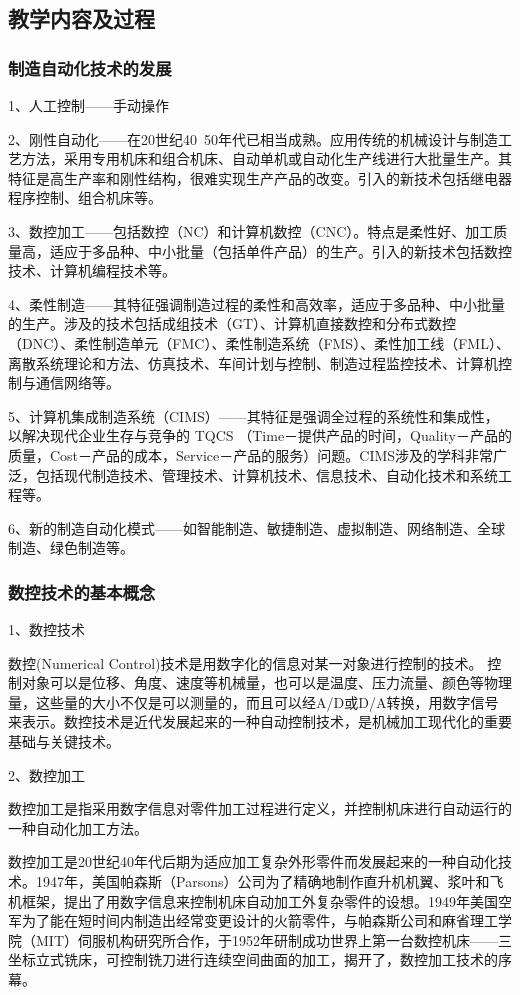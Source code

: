 \subsection{教学内容及过程}
\subsubsection{制造自动化技术的发展} 
1、人工控制——手动操作

2、刚性自动化——在20世纪40~50年代已相当成熟。应用传统的机械设计与制造工艺方法，采用专用机床和组合机床、自动单机或自动化生产线进行大批量生产。其特征是高生产率和刚性结构，很难实现生产产品的改变。引入的新技术包括继电器程序控制、组合机床等。

3、数控加工——包括数控（NC）和计算机数控（CNC）。特点是柔性好、加工质量高，适应于多品种、中小批量（包括单件产品）的生产。引入的新技术包括数控技术、计算机编程技术等。

4、柔性制造——其特征强调制造过程的柔性和高效率，适应于多品种、中小批量的生产。涉及的技术包括成组技术（GT）、计算机直接数控和分布式数控（DNC）、柔性制造单元（FMC）、柔性制造系统（FMS）、柔性加工线（FML）、离散系统理论和方法、仿真技术、车间计划与控制、制造过程监控技术、计算机控制与通信网络等。

5、计算机集成制造系统（CIMS）——其特征是强调全过程的系统性和集成性，以解决现代企业生存与竞争的 TQCS （Time－提供产品的时间，Quality－产品的质量，Cost－产品的成本，Service－产品的服务）问题。CIMS涉及的学科非常广泛，包括现代制造技术、管理技术、计算机技术、信息技术、自动化技术和系统工程等。

6、新的制造自动化模式——如智能制造、敏捷制造、虚拟制造、网络制造、全球制造、绿色制造等。

\subsubsection{数控技术的基本概念} 
1、数控技术

数控(Numerical Control)技术是用数字化的信息对某一对象进行控制的技术。
控制对象可以是位移、角度、速度等机械量，也可以是温度、压力流量、颜色等物理量，这些量的大小不仅是可以测量的，而且可以经A/D或D/A转换，用数字信号来表示。数控技术是近代发展起来的一种自动控制技术，是机械加工现代化的重要基础与关键技术。

2、数控加工

数控加工是指采用数字信息对零件加工过程进行定义，并控制机床进行自动运行的一种自动化加工方法。

数控加工是20世纪40年代后期为适应加工复杂外形零件而发展起来的一种自动化技术。1947年，美国帕森斯（Parsons）公司为了精确地制作直升机机翼、浆叶和飞机框架，提出了用数字信息来控制机床自动加工外复杂零件的设想。1949年美国空军为了能在短时间内制造出经常变更设计的火箭零件，与帕森斯公司和麻省理工学院（MIT）伺服机构研究所合作，于1952年研制成功世界上第一台数控机床——三坐标立式铣床，可控制铣刀进行连续空间曲面的加工，揭开了，数控加工技术的序幕。


